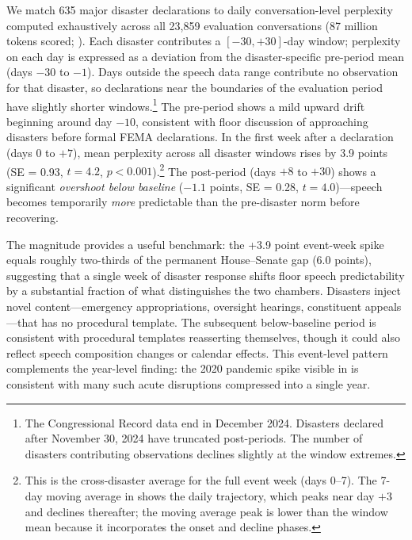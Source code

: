 \documentclass[12pt]{article}
\begin{document}
We match 635 major disaster declarations to daily conversation-level perplexity computed exhaustively across all 23,859 evaluation conversations (87 million tokens scored; ). Each disaster contributes a $[-30, +30]$-day window; perplexity on each day is expressed as a deviation from the disaster-specific pre-period mean (days $-30$ to $-1$). Days outside the speech data range contribute no observation for that disaster, so declarations near the boundaries of the evaluation period have slightly shorter windows.\footnote{The Congressional Record data end in December 2024. Disasters declared after November 30, 2024 have truncated post-periods. The number of disasters contributing observations declines slightly at the window extremes.} The pre-period shows a mild upward drift beginning around day $-10$, consistent with floor discussion of approaching disasters before formal FEMA declarations. In the first week after a declaration (days 0 to $+7$), mean perplexity across all disaster windows rises by 3.9 points (SE = 0.93, $t = 4.2$, $p < 0.001$).\footnote{This is the cross-disaster average for the full event week (days 0--7). The 7-day moving average in  shows the daily trajectory, which peaks near day $+3$ and declines thereafter; the moving average peak is lower than the window mean because it incorporates the onset and decline phases.} The post-period (days $+8$ to $+30$) shows a significant \textit{overshoot below baseline} ($-1.1$ points, SE = 0.28, $t = 4.0$)---speech becomes temporarily \textit{more} predictable than the pre-disaster norm before recovering.

The magnitude provides a useful benchmark: the +3.9 point event-week spike equals roughly two-thirds of the permanent House--Senate gap (6.0 points), suggesting that a single week of disaster response shifts floor speech predictability by a substantial fraction of what distinguishes the two chambers. Disasters inject novel content---emergency appropriations, oversight hearings, constituent appeals---that has no procedural template. The subsequent below-baseline period is consistent with procedural templates reasserting themselves, though it could also reflect speech composition changes or calendar effects. This event-level pattern complements the year-level finding: the 2020 pandemic spike visible in  is consistent with many such acute disruptions compressed into a single year.


\end{document}

